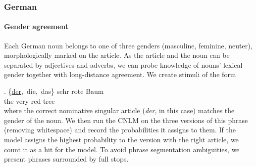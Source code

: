 \subsubsection{German}%


\paragraph{Gender agreement}
Each German noun belongs to one of three genders (masculine, feminine, neuter), morphologically marked on the article. As the article and the noun can be separated by adjectives and adverbs, we can probe knowledge of nouns' lexical gender together with long-distance agreement.
We create stimuli of the form

\exg. \{\underline{der},\ die,\ das\} sehr rote Baum \\
the very red tree \\


where the correct nominative singular article (\emph{der}, in this case) matches the gender of the noun.
We then run the CNLM on the three versions of this phrase (removing whitespace) and record the probabilities it assigns to them. If the model assigns the highest probability to the version with the right article, we count it as a hit for the model. To avoid phrase segmentation ambiguities, we present phrases surrounded by full stops.

